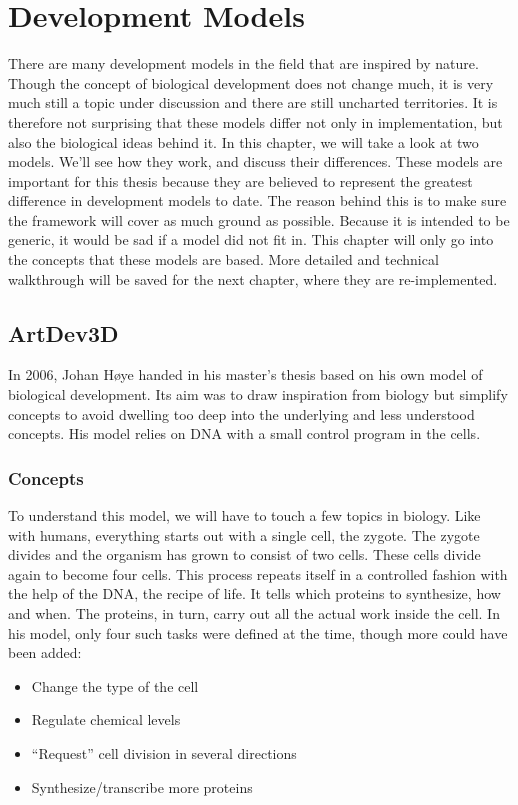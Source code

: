 \section{Development Models}
There are many development models in the field that are inspired by nature. Though the concept of biological development does not change much, it is very much still a topic under discussion and there are still uncharted territories. It is therefore not surprising that these models differ not only in implementation, but also the biological ideas behind it. In this chapter, we will take a look at two models. We'll see how they work, and discuss their differences. These models are important for this thesis because they are believed to represent the greatest difference in development models to date. The reason behind this is to make sure the framework will cover as much ground as possible. Because it is intended to be generic, it would be sad if a model did not fit in. This chapter will only go into the concepts that these models are based. More detailed and technical walkthrough will be saved for the next chapter, where they are re-implemented.

\subsection{ArtDev3D}
\label{sec:Models:ArtDev3D}
In 2006, Johan H{\o}ye handed in his master's thesis\cite{hoye2006} based on his own model of biological development. Its aim was to draw inspiration from biology but simplify concepts to avoid dwelling too deep into the underlying and less understood concepts. His model relies on DNA with a small control program in the cells.

\subsubsection{Concepts}
To understand this model, we will have to touch a few topics in biology. Like with humans, everything starts out with a single cell, the zygote. The zygote divides and the organism has grown to consist of two cells. These cells divide again to become four cells. This process repeats itself in a controlled fashion with the help of the DNA, the recipe of life. It tells which proteins to synthesize, how and when. The proteins, in turn, carry out all the actual work inside the cell. In his model, only four such tasks were defined at the time, though more could have been added:

\begin{itemize}
	\itemsep=0pt
	\item Change the type of the cell
	\item Regulate chemical levels
	\item ``Request'' cell division in several directions
	\item Synthesize/transcribe more proteins
\end{itemize}

